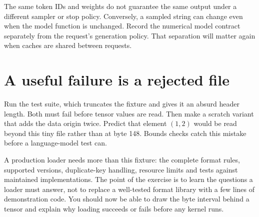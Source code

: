 The same token IDs and weights do not guarantee the same output under
a different sampler or stop policy. Conversely, a sampled string can
change even when the model function is unchanged. Record the numerical
model contract separately from the request's generation policy.
That separation will matter again when caches are shared between requests.

\section{A useful failure is a rejected file}
Run the test suite, which truncates the fixture and gives it an absurd
header length. Both must fail before tensor values are read. Then make
a scratch variant that adds the data origin twice. Predict that element
$(1,2)$ would be read beyond this tiny file rather than at byte 148.
Bounds checks catch this mistake before a language-model test can.

A production loader needs more than this fixture: the complete format
rules, supported versions, duplicate-key handling, resource limits and
tests against maintained implementations. The point of the exercise
is to learn the questions a loader must answer, not to replace a
well-tested format library with a few lines of demonstration code.
You should now be able to draw the byte interval behind a tensor and
explain why loading succeeds or fails before any kernel runs.

